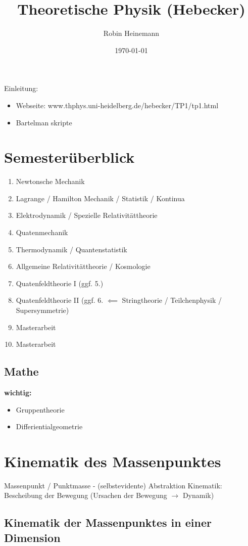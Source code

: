 \documentclass[a4paper]{scrartcl}
\author{Robin Heinemann}
\date{\today}
\title{Theoretische Physik (Hebecker)}
\theoremstyle{definition}
\theoremstyle{plain}
\theoremstyle{remark}
\theoremstyle{remark}
\begin{document}
\maketitle
\tableofcontents

Einleitung: \\
\begin{itemize}
\item Webseite: www.thphys.uni-heidelberg.de/hebecker/TP1/tp1.html
\item Bartelman skripte
\end{itemize}

\section{Semesterüberblick}
\label{sec-1}
\begin{enumerate}
\item Newtonsche Mechanik
\item Lagrange / Hamilton Mechanik / Statistik / Kontinua
\item Elektrodynamik / Spezielle Relativitättheorie
\item Quatenmechanik
\item Thermodynamik / Quantenstatistik
\item Allgemeine Relativitättheorie / Kosmologie
\item Quatenfeldtheorie I (ggf. 5.)
\item Quatenfeldtheorie II (ggf. 6. $\impliedby$ Stringtheorie / Teilchenphysik / Supersymmetrie)
\item Masterarbeit
\item Masterarbeit
\end{enumerate}
\subsection{Mathe}
\label{sec-1-1}
\textbf{wichtig:}
\begin{itemize}
\item Gruppentheorie
\item Differientialgeometrie
\end{itemize}
\section{Kinematik des Massenpunktes}
\label{sec-2}
Massenpunkt / Punktmasse - (selbstevidente) Abstraktion
Kinematik: Bescheibung der Bewegung (Ursachen der Bewegung $\rightarrow$ Dynamik)
\subsection{Kinematik der Massenpunktes in einer Dimension}
\label{sec-2-1}
\end{document}
